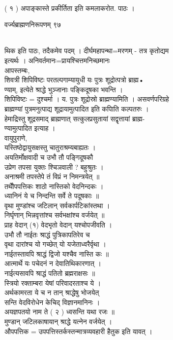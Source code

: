 \documentclass[11pt, openany]{book}
\begin{document}
{{{{{{{%

{\\
( १ ) अपाङ्कास्ते प्रकीर्तिता इति कमलाकरोत. पाठः ।

{ }{ वर्ज्यब्राह्मणनिरूपणम् \textbar{} ९७}{\\
थिक इति पाठः, तदैकमेव पदम् । दीर्घमहापन्था=मरणम् - तत्र कृतोद्यम\\
इत्यर्थः । अनिवर्तमानः=प्रायश्चित्तमनिच्छमानः \textbar{}\\
आपस्तम्बः,\\
शिवत्री शिपिविष्टः परतल्पगाम्यायुधी यः पुत्रः शूद्रोत्पत्रो ब्राह्म•\\
ण्याम्, इत्येते श्राद्धे भुञ्जानाः पङ्किदूषका भवन्ति ।\\
शिपिविष्टः = दुश्चर्मा । य. पुत्रः शूद्रोस्रो ब्राह्मण्यामिति ।
असवर्णपरिग्रहे\\
ब्राह्मण्यां पुत्रमनुत्पाद्य शूद्रायामुत्पादित इति कपािति कल्पतरुः ।\\
हेमाद्रिस्तु शूद्रसमाद् ब्राह्मणात् सत्कुलप्रसुतायां सद्वृत्तायां
ब्राह्म-\\
ण्यामुत्पादित इत्याह ।\\
वायुपुराणे,\\
यस्तिष्ठेद्वायुसक्षस्तु चातुराश्रम्यबाह्यतः ।\\
अयतिर्मोक्षवादी च उभौ तौ पङ्गिदूषकौ \textbar{}\textbar{}\\
उप्रेण तपसा युक्तः श्चिञवाली ? बहुश्रुतः ।\\
अनाश्रमी तपस्तेपे तं विप्रं न निमन्त्रयेत् ॥\\
तथैौपपत्तिकः शाठो नास्तिको वेदनिन्दकः ।\\
ध्यानिनं ये च निन्दन्ति सर्वे ते पदूषकाः ॥\\
वृथा मुण्डांश्च जटिलान् सर्वकार्पटिकांस्तथा ।\\
निर्घृणान् भिन्नवृत्तांश्च सर्वभक्षांश्च वर्जयेत् ॥\\
प्राह वेदान् (१) वेदभृतो वेदान् यश्चोपजीवति ।\\
उभौ तौ नाईतः श्राद्धं पुत्रिकापतिरेव च \textbar{}\textbar{}\\
वृथा दारांश्च यो गच्छेत् यो यजेताध्वरैर्वृथा ।\\
नाईतस्तावपि श्राद्धं द्विजो यश्चैव नास्ति कः ॥\\
आत्मार्थे यः पचेदनं न देवातिथिकारणात् ।\\
नाईत्यसावपि श्राद्धं पतितो ब्रह्मराक्षसः ॥\\
स्त्रियो रक्ताम्बरा येषां परिवादरताश्च ये ।\\
अर्थकामरता ये च न तान् श्राद्धेषु भोजयेत् \textbar{}\textbar{}\\
सन्ति वेदविरोधेन केचिद् विज्ञानमानिनः ।\\
अयज्ञपतयो नाम ते ( २ ) ध्वसन्ति यथा रजः ॥\\
मुण्डान् जटिलकाषायान् श्राद्धे यत्नेन वर्जयेत् ।\\
औपपत्तिक = उपपत्तिस्तर्कस्तन्मात्रव्यवहारी हैतुक इति यावत् ।

}}}}}}}}}
\end{document}
